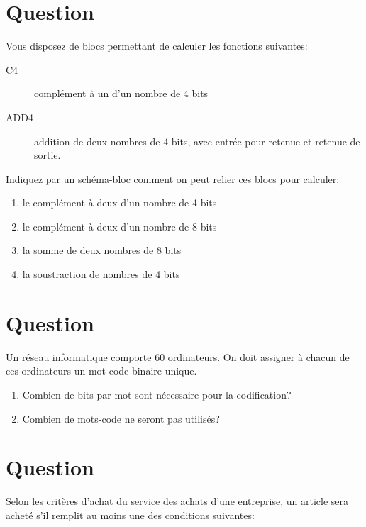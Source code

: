 \documentclass[letter, oneside]{book}
\begin{document}
\section*{Question}
\label{sec:org41472f3}
Vous disposez de blocs permettant de calculer les fonctions
   suivantes:

\begin{description}
\item[{C4}] complément à un d'un nombre de 4 bits

\item[{ADD4}] addition de deux nombres de 4 bits, avec entrée pour retenue et
retenue de sortie.
\end{description}

Indiquez par un schéma-bloc comment on peut relier ces blocs pour
calculer:

\begin{enumerate}
\item le complément à deux d'un nombre de 4 bits

\item le complément à deux d'un nombre de 8 bits

\item la somme de deux nombres de 8 bits

\item la soustraction de nombres de 4 bits
\end{enumerate}

\section*{Question}
\label{sec:org66ab6fb}
Un réseau informatique comporte 60 ordinateurs. On doit assigner à
   chacun de ces ordinateurs un mot-code binaire unique.

\begin{enumerate}
\item Combien de bits par mot sont nécessaire pour la codification?

\item Combien de mots-code ne seront pas utilisés?
\end{enumerate}

\section*{Question}
\label{sec:org84a050f}
Selon les critères d'achat du service des achats d'une entreprise, un
  article sera acheté s'il remplit au moins une des conditions
  suivantes:
\end{document}
